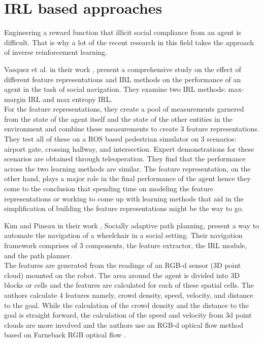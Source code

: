 \section{IRL based approaches}
Engineering a reward function that illicit social compliance from an agent is difficult. That is why a lot of the recent research in this field takes the approach of inverse reinforcement learning. \par 
Vasquez et al. in their work \cite{vasquez_inverse_2014}, present a comprehensive study on the effect of different feature representations and IRL methods on the performance of an agent in the task of social navigation. They examine two IRL methods: max-margin IRL and max entropy IRL.\\
For the feature representations, they create a pool of measurements garnered from the state of the agent itself and the state of the other entities in the environment and combine these measurements to create 3 feature representations. \\
They test all of these on a ROS based pedestrian simulator on 3 scenarios: airport gate, crossing hallway, and intersection. Expert demonstrations for these scenarios are obtained through teleoperation. They find that the performance across the two learning methods are similar. The feature representation, on the other hand, plays a major role in the final performance of the agent hence they come to the conclusion that spending time on modeling the feature representations or working to come up with learning methods that aid in the simplification of building the feature representations might be the way to go.
\\
\par
Kim and Pineau in their work \cite{kim_socially_2016}, Socially adaptive path planning, present a way to automate the navigation of a wheelchair in a social setting. Their navigation framework comprises of 3 components, the feature extractor, the IRL module, and the path planner.\\
The features are generated from the readings of an RGB-d sensor ($3$D point cloud) mounted on the robot. The area around the agent is divided into $3$D blocks or cells and the features are calculated for each of these spatial cells. 
The authors calculate $4$ features namely,
crowd density, speed, velocity, and distance to the goal.
While the calculation of the crowd density and the distance to the goal is straight forward, the calculation of the speed and velocity from 3d point clouds are more involved and the authors use an RGB-d optical flow method based on Farneback RGB optical flow \cite{farneback_optical_flow}. 
